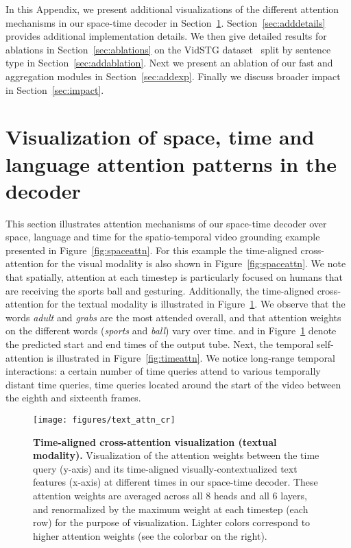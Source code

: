 In this Appendix, we present additional visualizations of the different attention mechanisms in our space-time decoder in Section~\ref{sec:viz}. 
Section~\ref{sec:adddetails} provides additional implementation details. 
We then give detailed results for ablations in Section~\ref{sec:ablations} on the VidSTG dataset~\cite{vidstg} split by sentence type in Section~\ref{sec:addablation}.
Next we present an ablation of our fast and aggregation modules in Section~\ref{sec:addexp}.
Finally we discuss broader impact in Section~\ref{sec:impact}.

\section{Visualization of space, time and language attention patterns in the decoder}\label{sec:viz}
This section illustrates attention mechanisms of our space-time decoder over space, language and time for the spatio-temporal video grounding example presented in Figure~\ref{fig:spaceattn}. 
For this example the time-aligned cross-attention for the visual modality is also shown in Figure~\ref{fig:spaceattn}.
We note that spatially, attention at each timestep is particularly focused on humans that are receiving the sports ball and gesturing.
Additionally, the time-aligned cross-attention for the textual modality is illustrated in Figure~\ref{fig:textattn}. 
We observe that the words \textit{adult} and \textit{grabs} are the most attended overall, and that attention weights on the different words (\eg \textit{sports} and \textit{ball}) vary over time.  and  in Figure~\ref{fig:textattn} denote the predicted start and end times of the output tube.
Next, the temporal self-attention is illustrated in Figure~\ref{fig:timeattn}. 
We notice long-range temporal interactions: a certain number of time queries attend to various temporally distant time queries, \eg time queries located around the start of the video between the eighth and sixteenth frames.

\begin{figure}[t]
\centering
\texttt{[image: figures/text\_attn\_cr]}
\vspace{+0.1cm}
\caption{\small \textbf{Time-aligned cross-attention visualization (textual modality).} 
Visualization of the attention weights between the time query (y-axis) and its time-aligned visually-contextualized text features (x-axis) at different times in our space-time decoder. 
These attention weights are averaged across all 8 heads and all 6 layers, and renormalized by the maximum weight at each timestep (\ie each row) for the purpose of visualization. Lighter colors correspond to higher attention weights (see the colorbar on the right).
}
\vspace{+0.1cm}
\label{fig:textattn}
\end{figure}

